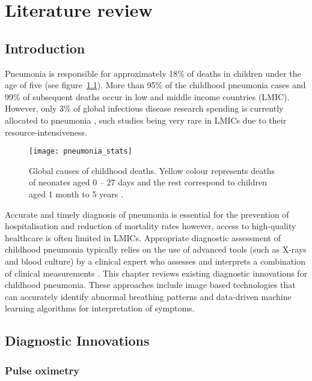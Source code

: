 \chapter{Literature review}
\label{chapter:literature_review} 


\section{Introduction}


Pneumonia is responsible for approximately 18\% of deaths in children under the age of five (see figure~\ref{pneumonia_stats}). More than 95\% of the childhood pneumonia cases and 99\% of subsequent deaths occur in low and middle income countries (LMIC)\cite{rudan2013epidemiology}.  However, only 3\% of global infectious disease research spending is currently allocated to pneumonia \cite{savethechildren}, such studies being very rare in LMICs due to their resource-intensiveness.

\begin{figure}
	\centering
    \texttt{[image: pneumonia\_stats]}
    \caption[Global causes of childhood deaths.] 
    {
    Global causes of childhood deaths. Yellow colour represents deaths of neonates aged 0 – 27 days and the rest correspond to children aged 1 month to 5 years \cite{black2010global}.
    }
    \label{pneumonia_stats}
\end{figure}

Accurate and timely diagnosis of pneumonia is essential for the prevention of hospitalisation and reduction of mortality rates however, access to high-quality healthcare is often limited in LMICs. Appropriate diagnostic assessment of childhood pneumonia typically relies on the use of advanced tools (such as X-rays and blood culture) by a clinical expert who assesses and interprets a combination of clinical measurements \cite{graham2008challenges}. This chapter reviews existing diagnostic innovations for childhood pneumonia. These approaches include image based technologies that can accurately identify abnormal breathing patterns and data-driven machine learning algorithms for interpretation of symptoms. 

\section{Diagnostic Innovations}

\subsection{Pulse oximetry}

